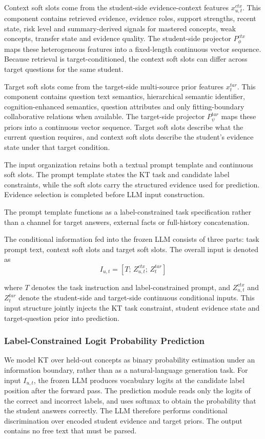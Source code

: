 \documentclass[a4paper,12pt]{article}
\numberwithin{table}{section}
\begin{document}
Context soft slots come from the student-side evidence-context features \(x^{ctx}_{u,t}\). This component contains retrieved evidence, evidence roles, support strengths, recent state, risk level and summary-derived signals for mastered concepts, weak concepts, transfer state and evidence quality. The student-side projector \(P_{\phi}^{ctx}\) maps these heterogeneous features into a fixed-length continuous vector sequence. Because retrieval is target-conditioned, the context soft slots can differ across target questions for the same student.

Target soft slots come from the target-side multi-source prior features \(x^{tar}_{t}\). This component contains question text semantics, hierarchical semantic identifier, cognition-enhanced semantics, question attributes and only fitting-boundary collaborative relations when available. The target-side projector \(P_{\psi}^{tar}\) maps these priors into a continuous vector sequence. Target soft slots describe what the current question requires, and context soft slots describe the student's evidence state under that target condition.

The input organization retains both a textual prompt template and continuous soft slots. The prompt template states the KT task and candidate label constraints, while the soft slots carry the structured evidence used for prediction. Evidence selection is completed before LLM input construction.

The prompt template functions as a label-constrained task specification rather than a channel for target answers, external facts or full-history concatenation.

The conditional information fed into the frozen LLM consists of three parts: task prompt text, context soft slots and target soft slots. The overall input is denoted as
\[
I_{u,t}=[T;\,Z^{ctx}_{u,t};\,Z^{tar}_{t}]
\]

where \(T\) denotes the task instruction and label-constrained prompt, and \(Z^{ctx}_{u,t}\) and \(Z^{tar}_{t}\) denote the student-side and target-side continuous conditional inputs. This input structure jointly injects the KT task constraint, student evidence state and target-question prior into prediction.

\subsubsection{Label-Constrained Logit Probability Prediction}

We model KT over held-out concepts as binary probability estimation under an information boundary, rather than as a natural-language generation task. For input \(I_{u,t}\), the frozen LLM produces vocabulary logits at the candidate label position after the forward pass. The prediction module reads only the logits of the correct and incorrect labels, and uses softmax to obtain the probability that the student answers correctly. The LLM therefore performs conditional discrimination over encoded student evidence and target priors. The output contains no free text that must be parsed.
\end{document}
